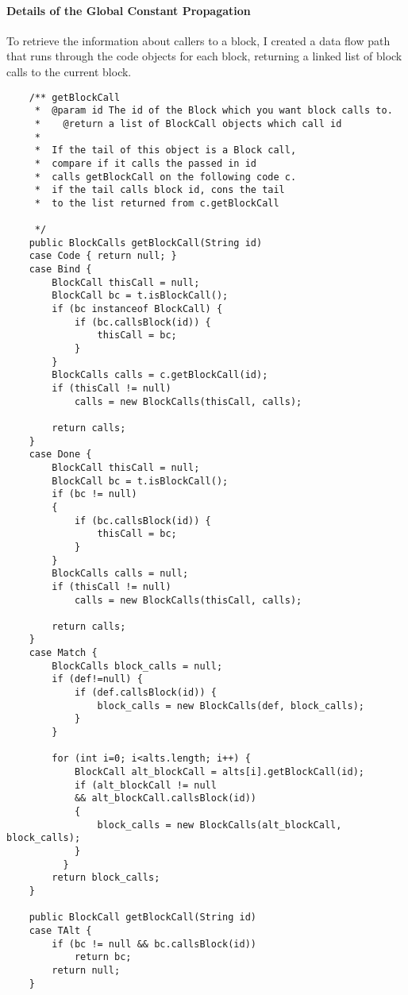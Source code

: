 \documentclass[14pt]{article}
\begin{document}
\paragraph{Details of the Global Constant Propagation}
To retrieve the information about callers to a block, I created a data flow path that runs through the code objects for each block, returning a linked list of block calls to the current block.
\begin{verbatim}    /** getBlockCall 
     *  @param id The id of the Block which you want block calls to.
     *    @return a list of BlockCall objects which call id
     *
     *  If the tail of this object is a Block call,
     *  compare if it calls the passed in id
     *  calls getBlockCall on the following code c.
     *  if the tail calls block id, cons the tail
     *  to the list returned from c.getBlockCall
     
     */
    public BlockCalls getBlockCall(String id)
    case Code { return null; }
    case Bind {
        BlockCall thisCall = null;
        BlockCall bc = t.isBlockCall();
        if (bc instanceof BlockCall) {
            if (bc.callsBlock(id)) {
                thisCall = bc;
            }
        }
        BlockCalls calls = c.getBlockCall(id);
        if (thisCall != null)
            calls = new BlockCalls(thisCall, calls);
        
        return calls;
    }
    case Done { 
        BlockCall thisCall = null;
        BlockCall bc = t.isBlockCall();
        if (bc != null)
        {
            if (bc.callsBlock(id)) {
                thisCall = bc;
            }
        }
        BlockCalls calls = null;
        if (thisCall != null)
            calls = new BlockCalls(thisCall, calls);
        
        return calls;
    }
    case Match {
        BlockCalls block_calls = null;
        if (def!=null) {
            if (def.callsBlock(id)) {
                block_calls = new BlockCalls(def, block_calls);
            }
        }

        for (int i=0; i<alts.length; i++) {
            BlockCall alt_blockCall = alts[i].getBlockCall(id);
            if (alt_blockCall != null 
            && alt_blockCall.callsBlock(id))
            {
                block_calls = new BlockCalls(alt_blockCall, block_calls);
            }
          }
        return block_calls;
    }

    public BlockCall getBlockCall(String id)
    case TAlt { 
        if (bc != null && bc.callsBlock(id))
            return bc;
        return null;
    }
\end{verbatim}
\end{document}
